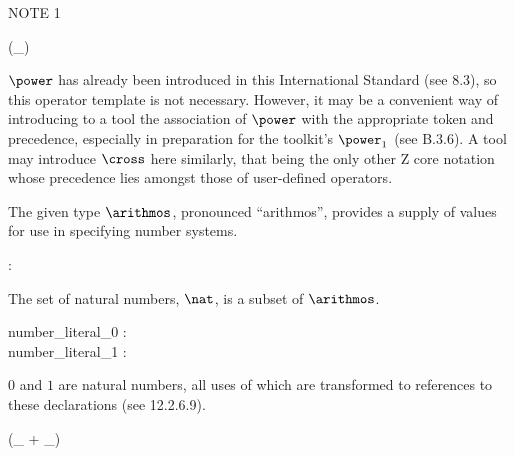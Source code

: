 \documentclass{article}
\begin{document}
%

%

NOTE 1
\begin{zed}
\generic (\power \_)
\end{zed}
$\power$ has already been introduced in this International Standard
(see 8.3),
so this operator template is not necessary.
However, it may be a convenient way of introducing to a tool
the association of $\power$ with the appropriate token and precedence,
especially in preparation for the toolkit's $\power_1$ (see B.3.6).
A tool may introduce $\cross$ here similarly,
that being the only other Z core notation whose precedence
lies amongst those of user-defined operators.


\begin{zed}
[\arithmos]
\end{zed}

The given type $\arithmos$, pronounced ``arithmos'', provides
a supply of values for use in specifying number systems.

\begin{axdef}
\nat : \power \arithmos
\end{axdef}

The set of natural numbers, $\nat$, is a subset of $\arithmos$.


\begin{axdef}
  number\_literal\_0 : \nat\\
  number\_literal\_1 : \nat
\end{axdef}

$0$ and $1$ are natural numbers, all uses of which are transformed
to references to these declarations (see 12.2.6.9).

\begin{zed}
 \leftassoc (\_ + \_)
\end{zed}
\end{document}
